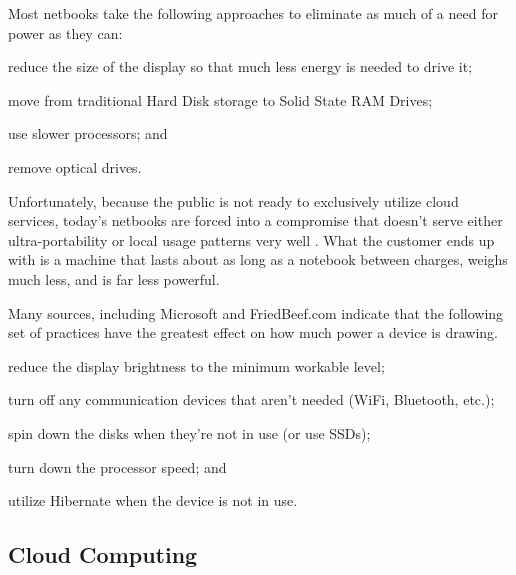 Most netbooks take the following approaches to eliminate as much of a need for
power as they can:
\begin{inparaenum}[(1)]
\item reduce the size of the display so that much less energy is needed to drive
  it;
\item move from traditional Hard Disk storage to Solid State RAM Drives;
\item use slower processors; and
\item remove optical drives.
\end{inparaenum}
Unfortunately, because the public is not ready to exclusively utilize cloud
services, today's netbooks are forced into a compromise that doesn't serve
either ultra-portability or local usage patterns very well \citep{gladstone09}.
What the customer ends up with is a machine that lasts about as long as a
notebook between charges, weighs much less, and is far less powerful.

Many sources, including Microsoft \citeyearpar{microsoftBattery} and
FriedBeef.com \citeyearpar{yeang2007} indicate that the following set of
practices have the greatest effect on how much power a device is drawing.
\begin{inparaenum}[(1)]
\item reduce the display brightness to the minimum workable level;
\item turn off any communication devices that aren't needed (WiFi, Bluetooth, etc.);
\item spin down the disks when they're not in use (or use SSDs);
\item turn down the processor speed; and
\item utilize Hibernate when the device is not in use.
\end{inparaenum}

\subsection{Cloud Computing}



